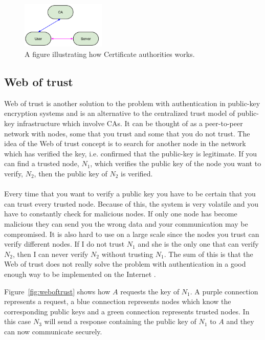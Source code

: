 \documentclass[frame, english]{idamasterthesis}
\begin{document}
\begin{figure}[h!]      %
    \centering
    \includegraphics[width = 40mm]{Pics/CA.png}
    \caption{A figure illustrating how Certificate authorities works.}
    \label{fig:certauth}
\end{figure}

\subsection{Web of trust}
Web of trust is another solution to the problem with authentication in public-key encryption systems and is an alternative to the centralized trust model of public-key infrastructure which involve CAs. It can be thought of as a peer-to-peer network with nodes, some that you trust and some that you do not trust. The idea of the Web of trust concept is to search for another node in the network which has verified the key, i.e. confirmed that the public-key is legitimate. If you can find a trusted node, $N_1$, which verifies the public key of the node you want to verify, $N_2$, then the public key of $N_2$ is verified. \\\\
Every time that you want to verify a public key you have to be certain that you can trust every trusted node. Because of this, the system is very volatile and you have to constantly check for malicious nodes. If only one node has become malicious they can send you the wrong data and your communication may be compromised. It is also hard to use on a large scale since the nodes you trust can verify different nodes. If I do not trust $N_1$ and she is the only one that can verify $N_2$, then I can never verify $N_2$ without trusting $N_1$. The sum of this is that the Web of trust does not really solve the problem with authentication in a good enough way to be implemented on the Internet \cite{rubin}.

\pagebreak

\noindent
Figure~\ref{fig:weboftrust} shows how $A$ requests the key of $N_1$. A purple connection represents a request, a blue connection represents nodes which know the corresponding public keys and a green connection represents trusted nodes. In this case $N_3$ will send a response containing the public key of $N_1$ to $A$ and they can now communicate securely.
\end{document}
